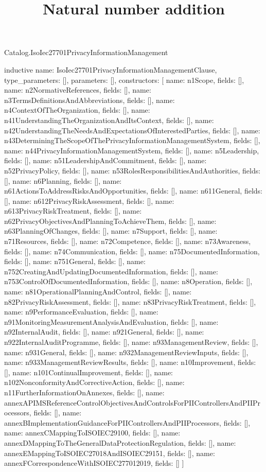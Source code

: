 \begin{lexlean}{Catalog.IsoIec27701PrivacyInformationManagement}
\title{Natural number addition}
\begin{semanticmodule}
inductive{
  name: IsoIec27701PrivacyInformationManagementClause,
  type_parameters: [],
  parameters: [],
  constructors: [
    {name: n1Scope, fields: []},
    {name: n2NormativeReferences, fields: []},
    {name: n3TermsDefinitionsAndAbbreviations, fields: []},
    {name: n4ContextOfTheOrganization, fields: []},
    {name: n41UnderstandingTheOrganizationAndItsContext, fields: []},
    {name: n42UnderstandingTheNeedsAndExpectationsOfInterestedParties, fields: []},
    {name: n43DeterminingTheScopeOfThePrivacyInformationManagementSystem, fields: []},
    {name: n44PrivacyInformationManagementSystem, fields: []},
    {name: n5Leadership, fields: []},
    {name: n51LeadershipAndCommitment, fields: []},
    {name: n52PrivacyPolicy, fields: []},
    {name: n53RolesResponsibilitiesAndAuthorities, fields: []},
    {name: n6Planning, fields: []},
    {name: n61ActionsToAddressRisksAndOpportunities, fields: []},
    {name: n611General, fields: []},
    {name: n612PrivacyRiskAssessment, fields: []},
    {name: n613PrivacyRiskTreatment, fields: []},
    {name: n62PrivacyObjectivesAndPlanningToAchieveThem, fields: []},
    {name: n63PlanningOfChanges, fields: []},
    {name: n7Support, fields: []},
    {name: n71Resources, fields: []},
    {name: n72Competence, fields: []},
    {name: n73Awareness, fields: []},
    {name: n74Communication, fields: []},
    {name: n75DocumentedInformation, fields: []},
    {name: n751General, fields: []},
    {name: n752CreatingAndUpdatingDocumentedInformation, fields: []},
    {name: n753ControlOfDocumentedInformation, fields: []},
    {name: n8Operation, fields: []},
    {name: n81OperationalPlanningAndControl, fields: []},
    {name: n82PrivacyRiskAssessment, fields: []},
    {name: n83PrivacyRiskTreatment, fields: []},
    {name: n9PerformanceEvaluation, fields: []},
    {name: n91MonitoringMeasurementAnalysisAndEvaluation, fields: []},
    {name: n92InternalAudit, fields: []},
    {name: n921General, fields: []},
    {name: n922InternalAuditProgramme, fields: []},
    {name: n93ManagementReview, fields: []},
    {name: n931General, fields: []},
    {name: n932ManagementReviewInputs, fields: []},
    {name: n933ManagementReviewResults, fields: []},
    {name: n10Improvement, fields: []},
    {name: n101ContinualImprovement, fields: []},
    {name: n102NonconformityAndCorrectiveAction, fields: []},
    {name: n11FurtherInformationOnAnnexes, fields: []},
    {name: annexAPIMSReferenceControlObjectivesAndControlsForPIIControllersAndPIIProcessors, fields: []},
    {name: annexBImplementationGuidanceForPIIControllersAndPIIProcessors, fields: []},
    {name: annexCMappingToISOIEC29100, fields: []},
    {name: annexDMappingToTheGeneralDataProtectionRegulation, fields: []},
    {name: annexEMappingToISOIEC27018AndISOIEC29151, fields: []},
    {name: annexFCorrespondenceWithISOIEC277012019, fields: []}
  ]
}


\end{semanticmodule}
\end{lexlean}
